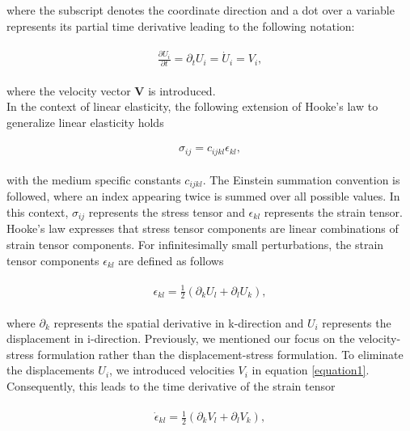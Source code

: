 where the subscript denotes the coordinate direction and a dot over a variable represents its partial time derivative leading to the following notation:

\begin{align}
    \begin{split}
        \frac{\partial U_i}{\partial t} = \partial_t U_i = \dot{U}_i = V_i,
    \end{split}
    \label{equation1}
\end{align}

where the velocity vector \textbf{V} is introduced. \\

In the context of linear elasticity, the following extension of Hooke's law  to generalize linear elasticity holds

\begin{align}
    \begin{split}
        \sigma_{ij} = c_{ijkl}\epsilon_{kl},
    \end{split}
    \label{eq:hookeslaw}
\end{align}

with the medium specific constants $c_{ijkl}$. The Einstein summation convention
is followed, where an index appearing twice is summed over all possible values. In this context, $\sigma_{ij}$ represents the stress tensor
and $\epsilon_{kl}$ represents the strain tensor. Hooke's law expresses that stress tensor components are linear combinations of strain tensor
components. For infinitesimally small perturbations, the strain tensor components $\epsilon_{kl}$ are defined as follows

\begin{align}
    \begin{split}
        \epsilon_{kl} = \frac{1}{2}\left(\partial_k U_l + \partial_l U_k \right) ,
    \end{split}
\end{align}

where $\partial_k$ represents the spatial derivative in k-direction and $U_i$ represents the displacement in i-direction.
Previously, we mentioned our focus on the velocity-stress formulation rather than the displacement-stress formulation.
To eliminate the displacements $U_i$, we introduced velocities $V_i$ in equation \ref{equation1}.
Consequently, this leads to the time derivative of the strain tensor

\begin{align}
    \begin{split}
        \dot{\epsilon}_{kl} = \frac{1}{2}\left( \partial_k V_l + \partial_l V_k \right) ,
    \end{split}
\end{align}

